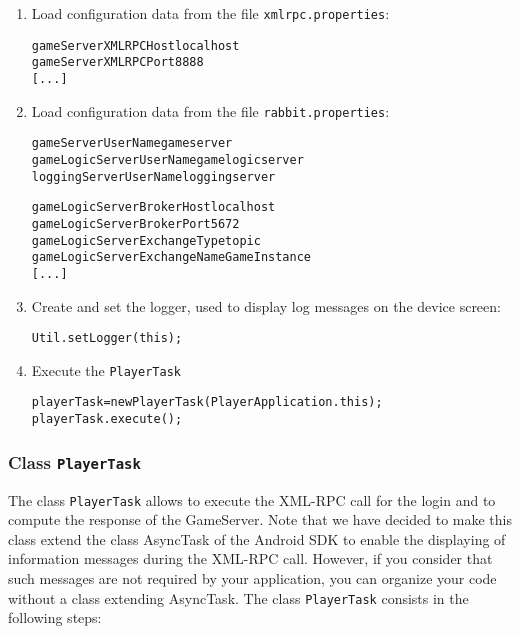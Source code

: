 \begin{enumerate}
\item Load configuration data from the file \texttt{xmlrpc.properties}:
\begin{small}
\begin{alltt}
gameServerXMLRPCHost        localhost
gameServerXMLRPCPort        8888
[...]
\end{alltt}
\end{small}
\item Load configuration data from the file \texttt{rabbit.properties}:
\begin{small}
\begin{alltt}
gameServerUserName          gameserver
gameLogicServerUserName	    gamelogicserver
loggingServerUserName       loggingserver

gameLogicServerBrokerHost   localhost
gameLogicServerBrokerPort   5672
gameLogicServerExchangeType topic
gameLogicServerExchangeName GameInstance
[...]
\end{alltt}
\end{small}
\item Create and set the logger, used to display log messages on the device 
screen:
\begin{small}
\begin{alltt}
Util.setLogger(this);
\end{alltt}
\end{small}
\item Execute the \texttt{PlayerTask}
\begin{small}
\begin{alltt}
playerTask = new PlayerTask(PlayerApplication.this);
playerTask.execute();
\end{alltt}
\end{small}
\end{enumerate}

\subsubsection{Class \texttt{PlayerTask}}


The class \texttt{PlayerTask} allows to execute the XML-RPC call for the login 
and to compute the response of the GameServer. Note that we have decided to 
make this class extend the class AsyncTask of the Android SDK to enable the 
displaying of information messages during the XML-RPC call. However, if you 
consider that such messages are not required by your application, you can 
organize your code without a class extending AsyncTask.
The class \texttt{PlayerTask} consists in the following steps:

